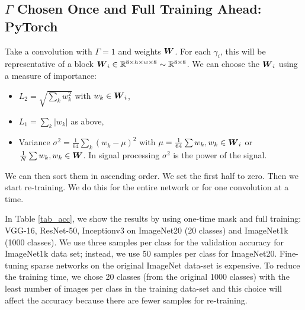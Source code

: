 \documentclass{IEEEtran}
\begin{document}
\subsection{$\Gamma$ Chosen Once and Full Training Ahead: PyTorch}
\label{sec:one-mask}
\label{sec:pytorch}
Take a convolution with $\Gamma = 1$ and weights ${\boldsymbol W}$. For each
$\gamma_i$, this will be representative of a block ${\boldsymbol W}_i \in \mathbb{R}^{8
  \times h \times w \times 8} \sim \mathbb{R}^{8\times 8}$. We can choose the
${\boldsymbol W}_i$ using a measure of importance:
\begin{itemize}
  \item $L_2 = \sqrt{\sum_k w_k^2}$ with $w_k \in {\boldsymbol W}_i$,
  \item $L_1 = \sum_k |w_k|$ as above,
  \item Variance $\sigma^2 = \frac{1}{64}\sum_k (w_k -\mu)^2$ with
    $\mu = \frac{1}{64}\sum w_k, w_k \in {\boldsymbol W}_i $ or $\frac{1}{N}\sum
    w_k, w_k \in {\boldsymbol W}$. In signal processing $\sigma^2$ is the power
    of the signal.
\end{itemize}
We can then sort them in ascending order. We set the first half to
zero.  Then we start re-training. We do this for the entire network or
for one convolution at a time.

In Table \ref{tab_acc}, we show the results by using one-time mask
and full training: VGG-16, ResNet-50, Inceptionv3 on ImageNet20 (20
classes) and ImageNet1k (1000 classes).  We use three samples per
class for the validation accuracy for ImageNet1k data set; instead, we
use 50 samples per class for ImageNet20. Fine-tuning sparse networks
on the original ImageNet data-set \cite{deng2009imagenet} is
expensive. To reduce the training time, we chose 20 classes (from the
original 1000 classes) with the least number of images per class in
the training data-set and this choice will affect the accuracy because
there are fewer samples for re-training.
\end{document}
